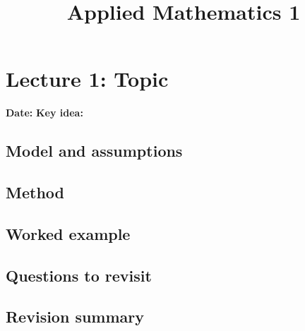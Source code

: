\documentclass[11pt,a4paper]{article}
\title{Applied Mathematics 1}
\author{}
\date{}
\theoremstyle{definition}
\begin{document}
\maketitle
\tableofcontents

\section{Lecture 1: Topic}\label{sec:lecture-1}
\noindent\textbf{Date:} \hfill \textbf{Key idea:}

\subsection{Model and assumptions}

\subsection{Method}

\subsection{Worked example}

\subsection{Questions to revisit}

\subsection{Revision summary}
\end{document}
